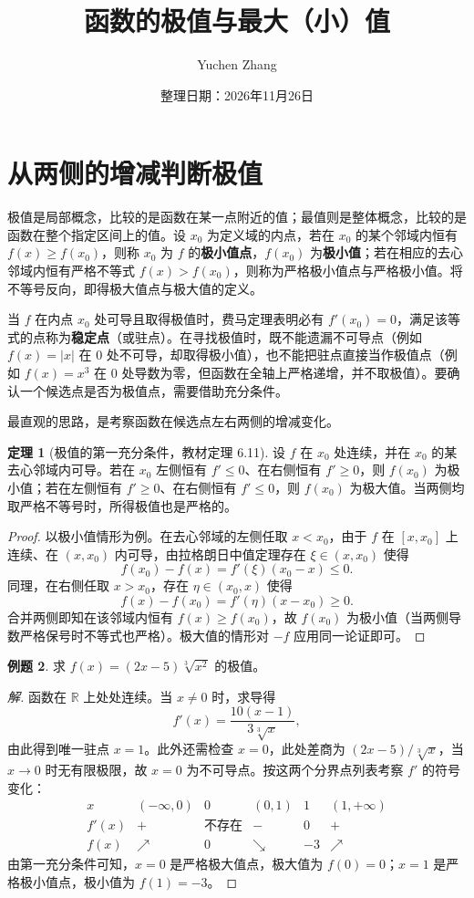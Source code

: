 \documentclass[UTF8,fontset=fandol,a4paper,12pt]{ctexart}
\title{函数的极值与最大（小）值}
\author{Yuchen Zhang}
\date{整理日期：2026年11月26日}
\makeatletter
\theoremstyle{definition}
\newtheorem{theorem}{定理}[section]
\newtheorem{example}[theorem]{例题}
\renewcommand{\maketitle}{\begin{center}{\LARGE\bfseries\@title\par}\vspace{0.6em}\@author\par\vspace{0.2em}{\small\@date\par}\end{center}}
\makeatother
\begin{document}
\maketitle

\section{从两侧的增减判断极值}
极值是局部概念，比较的是函数在某一点附近的值；最值则是整体概念，比较的是函数在整个指定区间上的值。设 $x_0$ 为定义域的内点，若在 $x_0$ 的某个邻域内恒有 $f(x)\ge f(x_0)$，则称 $x_0$ 为 $f$ 的\textbf{极小值点}，$f(x_0)$ 为\textbf{极小值}；若在相应的去心邻域内恒有严格不等式 $f(x)>f(x_0)$，则称为严格极小值点与严格极小值。将不等号反向，即得极大值点与极大值的定义。

当 $f$ 在内点 $x_0$ 处可导且取得极值时，费马定理表明必有 $f'(x_0)=0$，满足该等式的点称为\textbf{稳定点}（或驻点）。在寻找极值时，既不能遗漏不可导点（例如 $f(x)=|x|$ 在 $0$ 处不可导，却取得极小值），也不能把驻点直接当作极值点（例如 $f(x)=x^3$ 在 $0$ 处导数为零，但函数在全轴上严格递增，并不取极值）。要确认一个候选点是否为极值点，需要借助充分条件。

最直观的思路，是考察函数在候选点左右两侧的增减变化。

\begin{theorem}[极值的第一充分条件，教材定理 6.11]
设 $f$ 在 $x_0$ 处连续，并在 $x_0$ 的某去心邻域内可导。若在 $x_0$ 左侧恒有 $f'\le0$、在右侧恒有 $f'\ge0$，则 $f(x_0)$ 为极小值；若在左侧恒有 $f'\ge0$、在右侧恒有 $f'\le0$，则 $f(x_0)$ 为极大值。当两侧均取严格不等号时，所得极值也是严格的。
\end{theorem}

\begin{proof}
以极小值情形为例。在去心邻域的左侧任取 $x<x_0$，由于 $f$ 在 $[x,x_0]$ 上连续、在 $(x,x_0)$ 内可导，由拉格朗日中值定理存在 $\xi\in(x,x_0)$ 使得
\[
 f(x_0)-f(x)=f'(\xi)(x_0-x)\le0.
\]
同理，在右侧任取 $x>x_0$，存在 $\eta\in(x_0,x)$ 使得
\[
 f(x)-f(x_0)=f'(\eta)(x-x_0)\ge0.
\]
合并两侧即知在该邻域内恒有 $f(x)\ge f(x_0)$，故 $f(x_0)$ 为极小值（当两侧导数严格保号时不等式也严格）。极大值的情形对 $-f$ 应用同一论证即可。
\end{proof}

\begin{example}
求 $f(x)=(2x-5)\sqrt[3]{x^2}$ 的极值。
\end{example}

\begin{proof}[解]
函数在 $\mathbb R$ 上处处连续。当 $x\ne0$ 时，求导得
\[
 f'(x)=\frac{10(x-1)}{3\sqrt[3]{x}},
\]
由此得到唯一驻点 $x=1$。此外还需检查 $x=0$，此处差商为 $(2x-5)/\sqrt[3]{x}$，当 $x\to0$ 时无有限极限，故 $x=0$ 为不可导点。按这两个分界点列表考察 $f'$ 的符号变化：
\[
\begin{array}{c|ccccc}
x &(-\infty,0)&0&(0,1)&1&(1,+\infty)\\ \hline
f'(x)&+&\text{不存在}&-&0&+\\
f(x)&\nearrow&0&\searrow&-3&\nearrow
\end{array}
\]
由第一充分条件可知，$x=0$ 是严格极大值点，极大值为 $f(0)=0$；$x=1$ 是严格极小值点，极小值为 $f(1)=-3$。
\end{proof}
\end{document}
